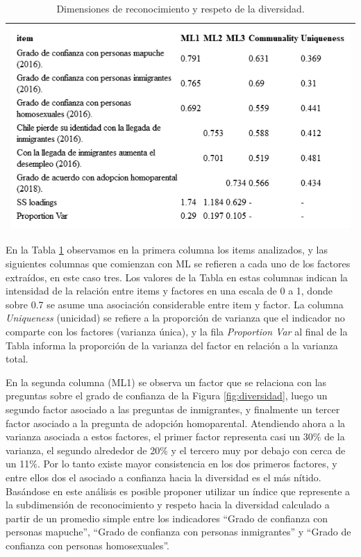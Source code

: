 \documentclass[
  12pt,
]{book}
\begin{document}
\begin{longtable}[]{@{}l@{}}
\caption{\label{tab:div-fa}Dimensiones de reconocimiento y respeto de la diversidad.}\tabularnewline
\toprule
\endhead
\includegraphics[width=6.77083in,height=\textheight]{output/tables/div_fa.png}\tabularnewline
\bottomrule
\end{longtable}

En la Tabla \ref{tab:div-fa} observamos en la primera columna los items analizados, y las siguientes columnas que comienzan con ML se refieren a cada uno de los factores extraídos, en este caso tres. Los valores de la Tabla en estas columnas indican la intensidad de la relación entre items y factores en una escala de 0 a 1, donde sobre 0.7 se asume una asociación considerable entre item y factor. La columna \emph{Uniqueness} (unicidad) se refiere a la proporción de varianza que el indicador no comparte con los factores (varianza única), y la fila \emph{Proportion Var} al final de la Tabla informa la proporción de la varianza del factor en relación a la varianza total.

En la segunda columna (ML1) se observa un factor que se relaciona con las preguntas sobre el grado de confianza de la Figura \ref{fig:diversidad}, luego un segundo factor asociado a las preguntas de inmigrantes, y finalmente un tercer factor asociado a la pregunta de adopción homoparental. Atendiendo ahora a la varianza asociada a estos factores, el primer factor representa casi un 30\% de la varianza, el segundo alrededor de 20\% y el tercero muy por debajo con cerca de un 11\%. Por lo tanto existe mayor consistencia en los dos primeros factores, y entre ellos dos el asociado a confianza hacia la diversidad es el más nítido. Basándose en este análisis es posible proponer utilizar un índice que represente a la subdimensión de reconocimiento y respeto hacia la diversidad calculado a partir de un promedio simple entre los indicadores ``Grado de confianza con personas mapuche'', ``Grado de confianza con personas inmigrantes'' y ``Grado de confianza con personas homosexuales''.
\end{document}
